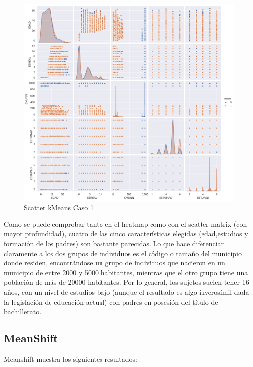 \begin{figure}[H] %
	\centering
	\includegraphics[scale=0.4]{kmeans-1.png}  %
	\caption{Scatter kMeans Caso 1} 
	\label{fig:sc-km-caso1}
\end{figure}

Como se puede comprobar tanto en el heatmap como con el scatter matrix (con mayor profundidad), cuatro de las cinco características elegidas (edad,estudios y formación de los padres) son bastante parecidas. Lo que hace diferenciar claramente a los dos grupos de individuos es el código o tamaño del municipio donde residen, encontrándose un grupo de individuos que nacieron en un municipio de entre 2000 y 5000 habitantes, mientras que el otro grupo tiene una población de más de 20000 habitantes. Por lo general, los sujetos suelen tener 16 años, con un nivel de estudios bajo (aunque el resultado es algo inverosímil dada la legislación de educación actual) con padres en posesión del título de bachillerato.

\newpage

\subsection{MeanShift}

Meanshift muestra los siguientes resultados:

